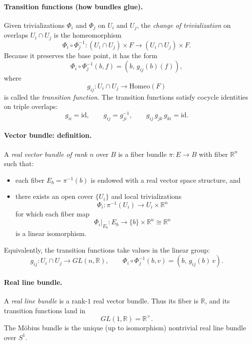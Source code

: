 \documentclass[12pt,a4paper]{article}
\theoremstyle{plain}
\theoremstyle{definition}      %
\begin{document}
\paragraph{Transition functions (how bundles glue).}
Given trivializations $\Phi_i$ and $\Phi_j$ on $U_i$ and $U_j$, the \emph{change of
	trivialization} on overlaps $U_i\cap U_j$ is the homeomorphism
\[
\Phi_i\circ \Phi_j^{-1}:(U_i\cap U_j)\times F \longrightarrow (U_i\cap U_j)\times F.
\]
Because it preserves the base point, it has the form
\[
\Phi_i\circ \Phi_j^{-1}(b,f)=(b,\,g_{ij}(b)(f)),
\]
where
\[
g_{ij}:U_i\cap U_j\to \mathrm{Homeo}(F)
\]
is called the \emph{transition function}. The transition functions satisfy cocycle
identities on triple overlaps:
\[
g_{ii}=\mathrm{id},\qquad g_{ij}=g_{ji}^{-1},\qquad g_{ij}\,g_{jk}\,g_{ki}=\mathrm{id}.
\]

\paragraph{Vector bundle: definition.}
A \emph{real vector bundle of rank $n$} over $B$ is a fiber bundle $\pi:E\to B$ with fiber
$\mathbb{R}^n$ such that:
\begin{itemize}
	\item each fiber $E_b=\pi^{-1}(b)$ is endowed with a real vector space structure, and
	\item there exists an open cover $\{U_i\}$ and local trivializations
	\[
	\Phi_i:\pi^{-1}(U_i)\to U_i\times \mathbb{R}^n
	\]
	for which each fiber map
	\[
	\Phi_i\big|_{E_b}:E_b\to \{b\}\times \mathbb{R}^n\cong \mathbb{R}^n
	\]
	is a linear isomorphism.
\end{itemize}
Equivalently, the transition functions take values in the linear group:
\[
g_{ij}:U_i\cap U_j\to GL(n,\mathbb{R}),\qquad
\Phi_i\circ\Phi_j^{-1}(b,v)=(b,\,g_{ij}(b)\,v).
\]

\paragraph{Real line bundle.}
A \emph{real line bundle} is a rank-$1$ real vector bundle. Thus its fiber is
$\mathbb{R}$, and its transition functions land in
\[
GL(1,\mathbb{R})=\mathbb{R}^\times.
\]
The Möbius bundle is the unique (up to isomorphism) nontrivial real line bundle over
$S^1$.

	
\end{document}
